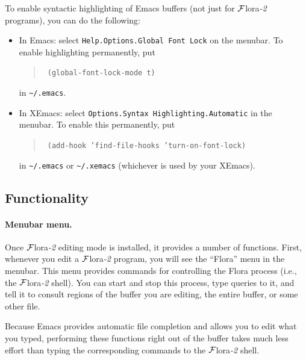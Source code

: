 \documentclass[11pt]{article}
\newcommand{\FLSYSTEM}{{\mbox{\sc ${\cal F}${lora}\rm\emph{-2}}}\xspace}
\begin{document}
To enable syntactic highlighting of Emacs buffers (not just for \FLSYSTEM
programs), you can do the following:
\begin{itemize}
  \item  {\sf In Emacs:} select {\tt Help.Options.Global Font Lock} on
    the menubar.  To enable highlighting permanently, put 
    \begin{quote}
      \tt
      (global-font-lock-mode t)
    \end{quote}
    in \verb|~/.emacs|.
  \item {\sf In XEmacs:} select {\tt Options.Syntax
        Highlighting.Automatic} in the menubar. To enable this permanently, put
      \begin{quote}
        \tt
        (add-hook 'find-file-hooks 'turn-on-font-lock)
      \end{quote}
      in \verb|~/.emacs| or \verb|~/.xemacs| (whichever is used by your
      XEmacs).
\end{itemize}


\subsection{Functionality}


\paragraph{Menubar menu.}
Once \FLSYSTEM editing mode is installed, it provides a number of functions.
First, whenever you edit a \FLSYSTEM program, you will see the ``Flora'' menu
in the menubar. This menu provides commands for controlling the Flora
process (i.e., the \FLSYSTEM shell). You can start and stop
this process, type queries to it, and tell it to consult regions of
the buffer you are editing, the entire buffer, or some other file.

Because Emacs provides automatic file completion and allows you to edit
what you typed, performing these functions right out of the buffer takes
much less effort than typing the corresponding commands to the \FLSYSTEM
shell.
\end{document}
